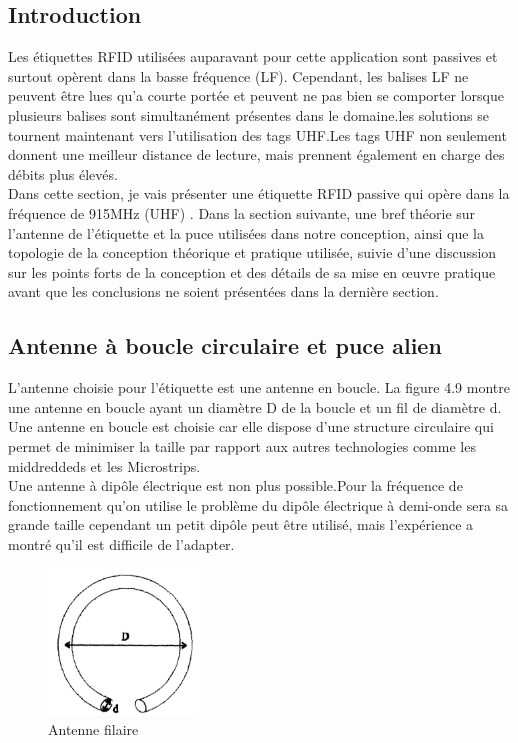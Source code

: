 \documentclass[11pt, a4paper, twoside]{book}
\begin{document}
\subsection{Introduction}
Les étiquettes RFID utilisées auparavant pour cette application sont passives et surtout opèrent dans la basse fréquence (LF). Cependant, les balises LF ne peuvent être lues qu'a courte portée et peuvent ne pas bien se comporter lorsque plusieurs balises sont simultanément présentes dans le domaine.les solutions se tournent maintenant vers l'utilisation des tags UHF.Les tags UHF non seulement donnent une meilleur distance de lecture, mais prennent également en charge des débits plus élevés. \\

Dans cette section, je vais présenter  une étiquette RFID passive qui opère dans la fréquence de 915MHz (UHF) . Dans la section suivante, une bref  théorie  sur l'antenne de l'étiquette et la puce utilisées dans notre conception, ainsi que la topologie de la conception théorique et pratique utilisée, suivie d'une discussion sur les points forts de la conception et des détails de sa mise en œuvre pratique avant que les conclusions ne soient présentées dans la dernière section.\subsection{Antenne à boucle circulaire et puce alien}
L'antenne choisie pour l'étiquette  est une antenne en boucle. La figure 4.9 montre une antenne en boucle ayant un diamètre D de la boucle et un fil de diamètre d. Une antenne en boucle est choisie car elle dispose d'une structure circulaire qui permet de minimiser la taille par rapport aux autres technologies comme les middreddeds et les Microstrips.\\

Une antenne à dipôle électrique est non plus possible.Pour la fréquence de fonctionnement qu'on utilise le problème du dipôle électrique à demi-onde sera sa grande taille cependant un petit dipôle peut être utilisé, mais l'expérience a montré qu'il est difficile de l'adapter.
\begin{figure}[H]
\centering
\includegraphics[width=4cm]{cla}
\caption{Antenne filaire}
\end{figure}
\end{document}
